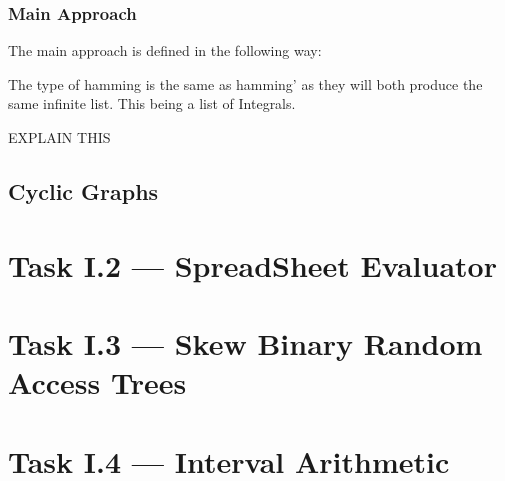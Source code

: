 \documentclass[a4paper]{article}
\begin{document}
\subsubsection{Main Approach}
The main approach is defined in the following way:

\par
The type of hamming is the same as hamming' as they will both produce the same infinite list.
This being a list of Integrals.
\par
EXPLAIN THIS

\subsection{Cyclic Graphs}

\section{Task I.2 --- SpreadSheet Evaluator}
\section{Task I.3 --- Skew Binary Random Access Trees}
\section{Task I.4 --- Interval Arithmetic}





% 
\end{document}
